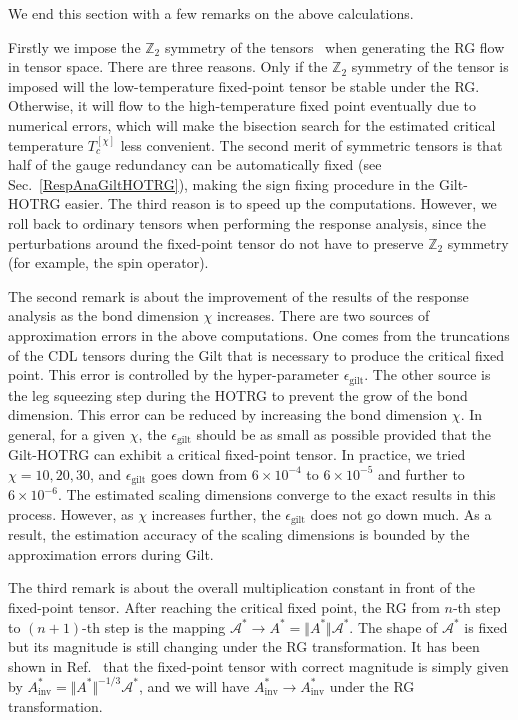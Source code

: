 \documentclass[aps,prb,reprint,superscriptaddress,floatfix]{revtex4-2}
\begin{document}
We end this section with a few remarks on the above calculations. 
%

Firstly we impose the $\mathbb{Z}_2$ symmetry of the
tensors~\cite{Singh2010SymTen, Singh2011U1Ten} when generating the RG
flow in tensor space. There are three reasons. Only if the
$\mathbb{Z}_2$ symmetry of the tensor is imposed will the
low-temperature fixed-point tensor be stable under the RG.  Otherwise, it
will flow to the high-temperature fixed point eventually due to
numerical errors, which will make the bisection search for the estimated
critical temperature $T_c^{[\chi]}$ less convenient. The second merit of
symmetric tensors is that half of the gauge redundancy can be
automatically fixed (see Sec.~\ref{RespAnaGiltHOTRG}), making the sign
fixing procedure in the Gilt-HOTRG easier. The third reason is to speed up
the computations. However, we roll back to ordinary tensors when
performing the response analysis, since the perturbations around the
fixed-point tensor do not have to preserve $\mathbb{Z}_2$ symmetry (for
example, the spin operator). 
%

The second remark is about the improvement of the results of the response
analysis as the bond dimension $\chi$ increases. There are two sources
of approximation errors in the above computations. One comes from the
truncations of the CDL tensors during the Gilt that is necessary to
produce the critical fixed point. This error is controlled by the
hyper-parameter $\epsilon_{\text{gilt}}$. The other source is the leg
squeezing step during the HOTRG to prevent the grow of the bond dimension.
This error can be reduced by increasing the bond dimension $\chi$. In
general, for a given $\chi$, the $\epsilon_{\text{gilt}}$ should be as small
as possible provided that the Gilt-HOTRG can exhibit a critical fixed-point
tensor. In practice, we tried $\chi = 10, 20, 30$, and
$\epsilon_{\text{gilt}}$ goes down from $6\times 10^{-4}$ to
$6\times10^{-5}$ and further to $6\times10^{-6}$.  The estimated scaling
dimensions converge to the exact results in this process. However, as
$\chi$ increases further, the $\epsilon_{\text{gilt}}$ does not go down
much. As a result, the estimation accuracy of the scaling dimensions is
bounded by the approximation errors during Gilt. 
%

The third remark is about the overall multiplication constant in front
of the fixed-point tensor. After reaching the critical fixed point, the
RG from $n$-th step to $(n+1)$-th step is the mapping
$\mathcal{A}^{*}\rightarrow A^{*} = \Vert A^{*} \Vert
\mathcal{A}^{*}$. The shape of $\mathcal{A}^*$ is fixed but its
magnitude is still changing under the RG transformation. It has been shown
in Ref.~\cite{GuWen2009} that the fixed-point tensor with correct
magnitude is simply given by $A^*_{\text{inv}} = \Vert A^* \Vert^{-1/3}
\mathcal{A}^*$, and we will have $A^*_{\text{inv}}\rightarrow
A^*_{\text{inv}}$ under the RG transformation.
%
\end{document}
